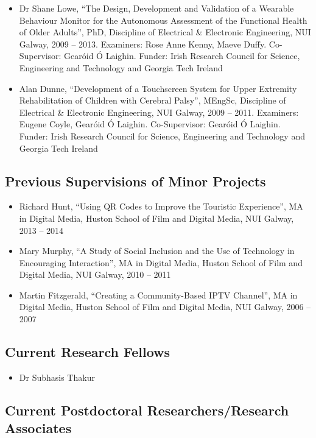 \documentclass[10pt,a4paper]{res} %
\begin{document}
\begin{resume}
\begin{itemize}
\item Dr Shane Lowe, ``The Design, Development and Validation of a Wearable Behaviour Monitor for the Autonomous Assessment of the Functional Health of Older Adults'', PhD, Discipline of Electrical \& Electronic Engineering, NUI Galway, 2009 -- 2013. Examiners: Rose Anne Kenny, Maeve Duffy. Co-Supervisor: Gear\'{o}id \'{O} Laighin. Funder: Irish Research Council for Science, Engineering and Technology and Georgia Tech Ireland
\item Alan Dunne, ``Development of a Touchscreen System for Upper Extremity Rehabilitation of Children with Cerebral Palsy'', MEngSc, Discipline of Electrical \& Electronic Engineering, NUI Galway, 2009 -- 2011. Examiners: Eugene Coyle, Gear\'{o}id \'{O} Laighin. Co-Supervisor: Gear\'{o}id \'{O} Laighin. Funder: Irish Research Council for Science, Engineering and Technology and Georgia Tech Ireland
\end{itemize}

\subsection*{Previous Supervisions of Minor Projects}

\begin{itemize} \itemsep -2pt
\item Richard Hunt, ``Using QR Codes to Improve the Touristic Experience'', MA in Digital Media, Huston School of Film and Digital Media, NUI Galway, 2013 -- 2014
\item Mary Murphy, ``A Study of Social Inclusion and the Use of Technology in Encouraging Interaction'', MA in Digital Media, Huston School of Film and Digital Media, NUI Galway, 2010 -- 2011
\item Martin Fitzgerald, ``Creating a Community-Based IPTV Channel'', MA in Digital Media, Huston School of Film and Digital Media, NUI Galway, 2006 -- 2007
\end{itemize}

\subsection*{Current Research Fellows}

\begin{itemize} \itemsep -2pt
\item Dr Subhasis Thakur
\end{itemize}

\subsection*{Current Postdoctoral Researchers/Research Associates}


\end{resume}
\end{document}
